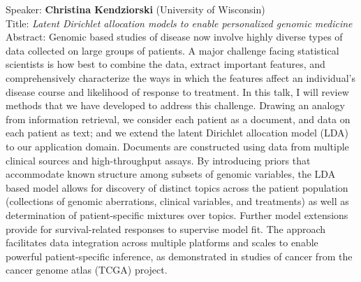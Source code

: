 \documentclass[11pt]{article}
\begin{document}
\bigskip
\noindent
Speaker: {\bf Christina Kendziorski} (University of Wisconsin)\\
Title: {\it Latent Dirichlet allocation models to enable personalized genomic medicine}\\
Abstract: Genomic based studies of disease now involve highly diverse types of
data collected on large groups of patients. A major challenge facing
statistical scientists is how best to combine the data, extract
important features, and comprehensively characterize the ways in which
the features affect an individual's disease course and likelihood of
response to treatment.  In this talk, I will review methods that we
have developed to address this challenge.  Drawing an analogy from
information retrieval, we consider each patient as a document, and
data on each patient as text; and we extend the latent Dirichlet
allocation model (LDA) to our application domain. Documents are
constructed using data from multiple clinical sources and
high-throughput assays. By introducing priors that accommodate known
structure among subsets of genomic variables, the LDA based model
allows for discovery of distinct topics across the patient population
(collections of genomic aberrations, clinical variables, and
treatments) as well as determination of patient-specific mixtures over
topics.  Further model extensions provide for survival-related
responses to supervise model fit.  The approach facilitates data
integration across multiple platforms and scales to enable powerful
patient-specific inference, as demonstrated in studies of cancer from
the cancer genome atlas (TCGA) project.
\end{document}
